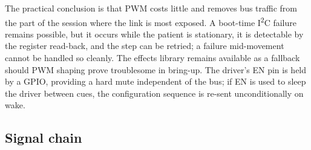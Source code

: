 \documentclass[11pt]{article}
\begin{document}
\noindent
The practical conclusion is that PWM costs little and removes bus traffic from
the part of the session where the link is most exposed. A boot-time
I\textsuperscript{2}C failure remains possible, but it occurs while the patient
is stationary, it is detectable by the register read-back, and the step can be
retried; a failure mid-movement cannot be handled so cleanly. The effects
library remains available as a fallback should PWM shaping prove troublesome in
bring-up. The driver's EN pin is held by a GPIO, providing a hard mute
independent of the bus; if EN is used to sleep the driver between cues, the
configuration sequence is re-sent unconditionally on wake.

\subsection{Signal chain}
\end{document}
